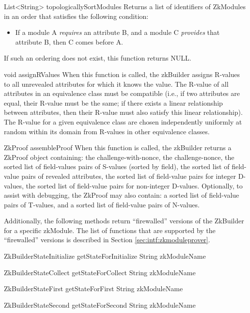   \begin{method}
  {List<String>}
  {topologicallySortModules}
  {
  }
  Returns a list of identifiers of ZkModules in an order that satisfies the following condition:
  \begin{itemize}
    \item If a module A \emph{requires} an attribute B, and a module C \emph{provides} that attribute B, then C comes before A.
  \end{itemize}
  If such an ordering does not exist, this function returns NULL.
  \end{method}

  \begin{method}
  {void}
  {assignRValues}
  {
  }
  When this function is called, the zkBuilder assigns R-values to all unrevealed attributes for which it knows the value.
  The R-value of all attributes in an equivalence class must be compatible (i.e., if two attributes are equal, their R-value
  must be the same; if there exists a linear relationship between attributes, then their R-value must also satisfy this
  linear relationship). The R-value for a given equivalence class are chosen independently uniformly at random within its domain
   from R-values in other equivalence classes.
  \end{method}

  \begin{method}
  {ZkProof}
  {assembleProof}
  {
  }
  When this function is called, the zkBuilder returns a ZkProof object containing: the challenge-with-nonce,
  the challenge-nonce, the sorted list of field-values pairs of S-values (sorted by field), the sorted list of
  field-value pairs of revealed attributes, the sorted list of field-value pairs for integer D-values,
  the sorted list of field-value pairs for non-integer D-values. Optionally, to assist with debugging, the ZkProof
  may also contain: a sorted list of field-value pairs of T-values, and a sorted list of field-value pairs of N-values.
  \end{method}

  Additionally, the following methods return ``firewalled'' versions of the ZkBuilder for a specific
  zkModule. The list of functions that
  are supported by the ``firewalled'' versions is described in Section \ref{sec:intf:zkmoduleprover}.

  \begin{method}
  {ZkBuilderStateInitialize}
  {getStateForInitialize}
  {
    {String zkModuleName}
  }
  \end{method}
  \begin{method}
  {ZkBuilderStateCollect}
  {getStateForCollect}
  {
    {String zkModuleName}
  }
  \end{method}
  \begin{method}
  {ZkBuilderStateFirst}
  {getStateForFirst}
  {
    {String zkModuleName}
  }
  \end{method}
  \begin{method}
  {ZkBuilderStateSecond}
  {getStateForSecond}
  {
    {String zkModuleName}
  }
  \end{method}

